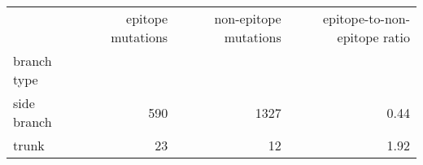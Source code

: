 \begin{tabular}{lrrr}
\toprule
{} &  epitope mutations &  non-epitope mutations &  epitope-to-non-epitope ratio \\
branch type &                    &                        &                               \\
\midrule
side branch &                590 &                   1327 &                          0.44 \\
trunk       &                 23 &                     12 &                          1.92 \\
\bottomrule
\end{tabular}
